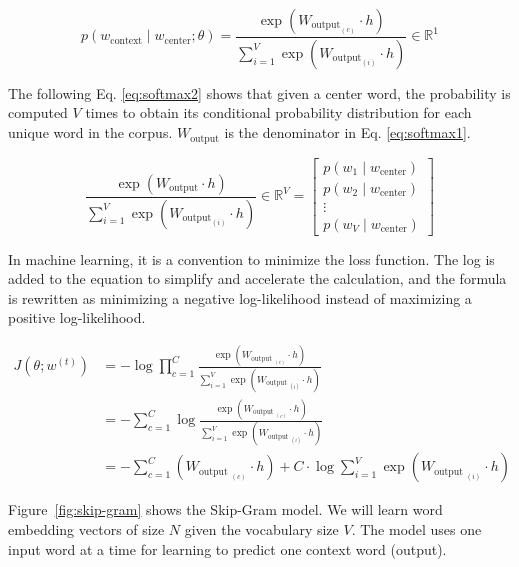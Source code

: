 \begin{equation}
    p\left(w_{\text {context}} \mid w_{\text {center}}; \theta \right)=\frac{\exp \left(W_{\text {output}_{{(c)}}} \cdot h\right)}{\sum_{i=1}^{V} \exp \left(W_{\text {output}_{(i)}} \cdot h\right)} \in \mathbb{R}^{1} \label{eq:softmax1}
\end{equation}

The following Eq. \ref{eq:softmax2} shows that given a center word, the probability is computed $V$ times to obtain its conditional probability distribution for each unique word in the corpus. $W_\text{output}$ is the denominator in Eq. \ref{eq:softmax1}.

\begin{equation}
    \frac{\exp \left(W_{\text {output}} \cdot h\right)}{\sum_{i=1}^{V} \exp \left(W_{\text {output}_{(i)}} \cdot h\right)} \in \mathbb{R}^{V}=\left[\begin{array}{c}
        p\left(w_{1} \mid w_{\text {center}}\right) \\
        p\left(w_{2} \mid w_{\text {center}}\right) \\
        \vdots \\
        p\left(w_{V} \mid w_{\text {center}}\right)
        \end{array}\right] \label{eq:softmax2}
\end{equation}

In machine learning, it is a convention to minimize the loss function. The log is added to the equation to simplify and accelerate the calculation, and the formula is rewritten as minimizing a negative log-likelihood instead of maximizing a positive log-likelihood.

\begin{align}
J\left(\theta ; w^{(t)}\right)&=-\log \prod_{c=1}^{C} \frac{\exp \left(W_{\text {output }_{(c)}} \cdot h\right)}{\sum_{i=1}^{V} \exp \left(W_{\text {output }_{(i)}} \cdot h\right)} \\
&=-\sum_{c=1}^{C} \log \frac{\exp \left(W_{\text {output }_{(c)}} \cdot h\right)}{\sum_{i=1}^{V} \exp \left(W_{\text {output }_{(i)}} \cdot h\right)} \\
&=-\sum_{c=1}^{C}\left(W_{\text {output }_{(c)}} \cdot h\right)+C \cdot \log \sum_{i=1}^{V} \exp \left(W_{\text {output }_{(i)}} \cdot h\right)
\end{align}

Figure~\ref{fig:skip-gram} shows the Skip-Gram model. We will learn word embedding vectors of size $N$ given the vocabulary size $V$. The model uses one input word at a time for learning to predict one context word (output).

